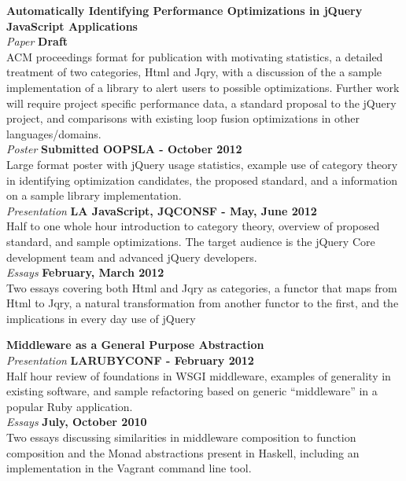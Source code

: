 \documentclass[margin,line]{resume}
\begin{document}
\begin{resume}
  \textbf{Automatically Identifying Performance Optimizations in jQuery JavaScript Applications}\vspace{2mm}\\
  \textsl{Paper} \hfill \textbf{Draft}\\
  ACM proceedings format for publication with motivating statistics, a detailed treatment of two categories, Html and Jqry, with a discussion of the a sample implementation of a library to alert users to possible optimizations. Further work will require project specific performance data, a standard proposal to the jQuery project, and comparisons with existing loop fusion optimizations in other languages/domains.\vspace{1mm}\\
  \textsl{Poster} \hfill \textbf{Submitted OOPSLA - October 2012}\\
  Large format poster with jQuery usage statistics, example use of category theory in identifying optimization candidates, the proposed standard, and a information on a sample library implementation.\vspace{1mm}\\
  \textsl{Presentation} \hfill \textbf{LA JavaScript, JQCONSF - May, June 2012}\\
  Half to one whole hour introduction to category theory, overview of proposed standard, and sample optimizations. The target audience is the jQuery Core development team and advanced jQuery developers.
  \vspace{1mm}\\
  \textsl{Essays} \hfill \textbf{February, March 2012}\\
  Two essays covering both Html and Jqry as categories, a functor that maps from Html to Jqry, a natural transformation from another functor to the first, and the implications in every day use of jQuery

  \textbf{Middleware as a General Purpose Abstraction}\vspace{2mm}\\
  \textsl{Presentation} \hfill \textbf{LARUBYCONF - February 2012}\\
  Half hour review of foundations in WSGI middleware, examples of generality in existing software, and sample refactoring based on generic ``middleware'' in a popular Ruby application.
  \vspace{1mm}\\
  \textsl{Essays} \hfill \textbf{July, October 2010}\\
  Two essays discussing similarities in middleware composition to function composition and the Monad abstractions present in Haskell, including an implementation in the Vagrant command line tool.\vspace{1mm}\\


\end{resume}
\end{document}
